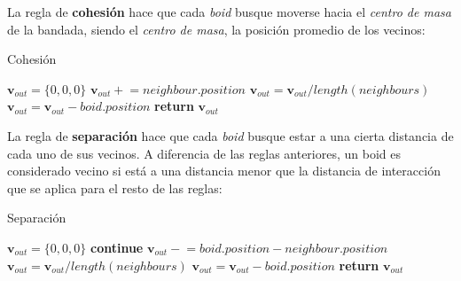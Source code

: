 \documentclass[a4paper]{article}
\begin{document}
            La regla de \textbf{cohesión} hace que cada \textit{boid} busque moverse hacia el \textit{centro de masa} de la bandada, siendo el \textit{centro de masa}, la posición promedio de los vecinos:

            \begin{algorithm}
                \caption{Cohesión}\label{pseudo:cohesion}
                \begin{algorithmic}[1]
                    \State $\bm{v}_{out} = \{0, 0, 0\}$
                        \State $\bm{v}_{out} \mathrel{+}= neighbour.position$
                    \EndFor
                    \State $\bm{v}_{out} = \bm{v}_{out} / length(neighbours)$
                    \State $\bm{v}_{out} = \bm{v}_{out} - boid.position$
                    \State \textbf{return} $\bm{v}_{out}$
                    \EndProcedure
                \end{algorithmic}
            \end{algorithm}

            \pagebreak

            La regla de \textbf{separación} hace que cada \textit{boid} busque estar a una cierta distancia de cada uno de sus vecinos. A diferencia de las reglas anteriores, un boid es considerado vecino si está a una distancia menor que la distancia de interacción que se aplica para el resto de las reglas:

            \begin{algorithm}
                \caption{Separación}\label{pseudo:separation}
                \begin{algorithmic}[1]
                    \State $\bm{v}_{out} = \{0, 0, 0\}$
                            \State \textbf{continue}
                        \EndIf
                        \State $\bm{v}_{out} \mathrel{-}= boid.position - neighbour.position$
                    \EndFor
                    \State $\bm{v}_{out} = \bm{v}_{out} / length(neighbours)$
                    \State $\bm{v}_{out} = \bm{v}_{out} - boid.position$
                    \State \textbf{return} $\bm{v}_{out}$
                    \EndProcedure
                \end{algorithmic}
            \end{algorithm}
\end{document}
